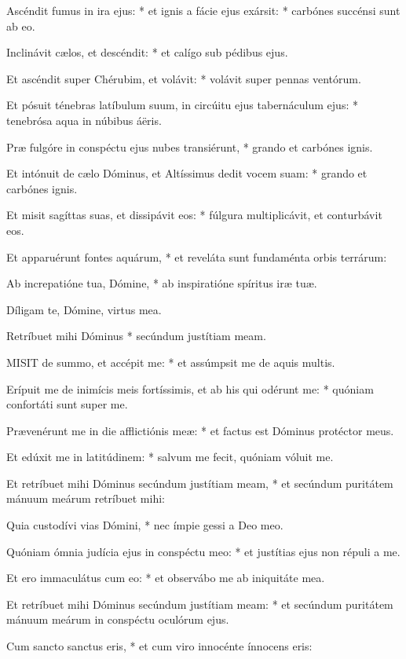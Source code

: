 Ascéndit fumus in ira ejus: * et ignis a fácie ejus exársit: * carbónes succénsi sunt ab eo.

Inclinávit cælos, et descéndit: * et calígo sub pédibus ejus.

Et ascéndit super Chérubim, et volávit: * volávit super pennas ventórum.

Et pósuit ténebras latíbulum suum, in circúitu ejus tabernáculum ejus: * tenebrósa aqua in núbibus áëris.

Præ fulgóre in conspéctu ejus nubes transiérunt, * grando et carbónes ignis.

Et intónuit de cælo Dóminus, et Altíssimus dedit vocem suam: * grando et carbónes ignis.

Et misit sagíttas suas, et dissipávit eos: * fúlgura multiplicávit, et conturbávit eos.

Et apparuérunt fontes aquárum, * et reveláta sunt fundaménta orbis terrárum:

Ab increpatióne tua, Dómine, * ab inspiratióne spíritus iræ tuæ.

 Díligam te, Dómine, virtus mea.

 Retríbuet mihi Dóminus * secúndum justítiam meam.


\lettrine[lines=2]{M}{ISIT} de summo, et accépit me: * et assúmpsit me de aquis multis.

Erípuit me de inimícis meis fortíssimis, et ab his qui odérunt me: * quóniam confortáti sunt super me.

Prævenérunt me in die afflictiónis meæ: * et factus est Dóminus protéctor meus.

Et edúxit me in latitúdinem: * salvum me fecit, quóniam vóluit me.

Et retríbuet mihi Dóminus secúndum justítiam meam, * et secúndum puritátem mánuum meárum retríbuet mihi:

Quia custodívi vias Dómini, * nec ímpie gessi a Deo meo.

Quóniam ómnia judícia ejus in conspéctu meo: * et justítias ejus non répuli a me.

Et ero immaculátus cum eo: * et observábo me ab iniquitáte mea.

Et retríbuet mihi Dóminus secúndum justítiam meam: * et secúndum puritátem mánuum meárum in conspéctu oculórum ejus.

Cum sancto sanctus eris, * et cum viro innocénte ínnocens eris:

